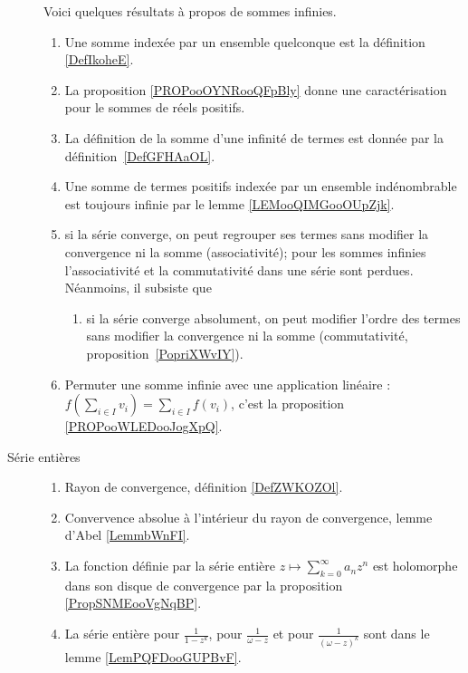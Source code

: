 \begin{description}
	      Voici quelques résultats à propos de sommes infinies.%
	      \begin{enumerate}
		      \item
                  Une somme indexée par un ensemble quelconque est la définition \ref{DefIkoheE}.
              \item
                  La proposition \ref{PROPooOYNRooQFpBly} donne une caractérisation pour le sommes de réels positifs.
		      \item
		            La définition de la somme d'une infinité de termes est donnée par la définition~\ref{DefGFHAaOL}.
		      \item
		            Une somme de termes positifs indexée par un ensemble indénombrable est toujours infinie par le lemme \ref{LEMooQIMGooOUpZjk}.
		      \item
		            si la série converge, on peut regrouper ses termes sans modifier la convergence ni la somme (associativité);
		            pour les sommes infinies l'associativité et la commutativité dans une série sont perdues. Néanmoins, il subsiste que
		            \begin{enumerate}
			            \item
			                  si la série converge absolument, on peut modifier l'ordre des termes sans modifier la convergence ni la somme (commutativité, proposition~\ref{PopriXWvIY}).
		            \end{enumerate}
		      \item Permuter une somme infinie avec une application linéaire : \( f(\sum_{i\in I}v_i)=\sum_{i\in I}f(v_i)\), c'est la proposition \ref{PROPooWLEDooJogXpQ}.
	      \end{enumerate}
	\item[Série entières]
	      \begin{enumerate}
		      \item
		            Rayon de convergence, définition \ref{DefZWKOZOl}.
		      \item
		            Convervence absolue à l'intérieur du rayon de convergence, lemme d'Abel \ref{LemmbWnFI}.
		      \item
		            La fonction définie par la série entière  \(z\mapsto \sum_{k=0}^{\infty}a_nz^n\) est holomorphe dans son disque de convergence par la proposition \ref{PropSNMEooVgNqBP}.
		      \item
		            La série entière pour \( \frac{1}{ 1-z^k }\), pour \( \frac{1}{ \omega-z }\) et pour \( \frac{1}{ (\omega-z)^k }\) sont dans le lemme \ref{LemPQFDooGUPBvF}.
	      \end{enumerate}
\end{description}
